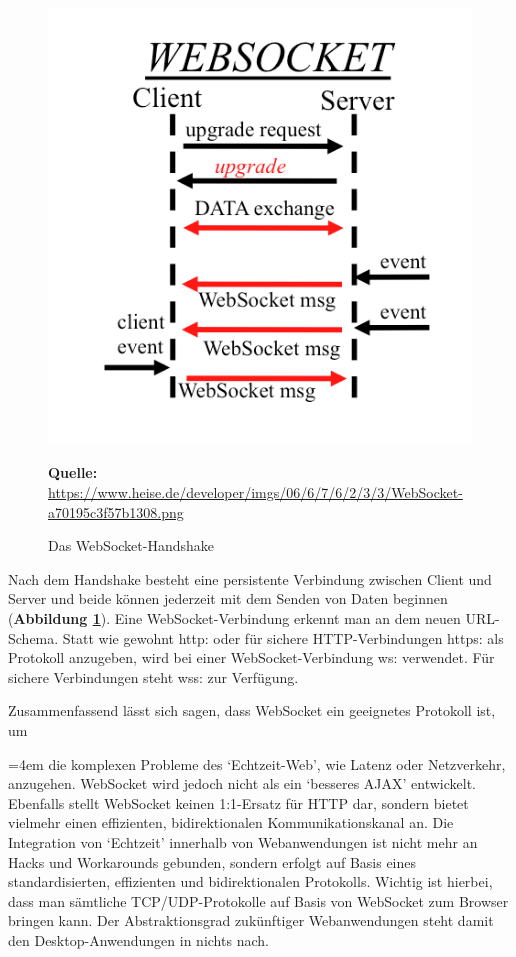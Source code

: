 \begin{figure}[H]
  \begin{center}
    \includegraphics[scale=0.4]{img/webSocketHandshake}
	\caption{Das WebSocket-Handshake}
	\footnotesize\sffamily\textbf{Quelle:} \url{https://www.heise.de/developer/imgs/06/6/7/6/2/3/3/WebSocket-a70195c3f57b1308.png} 
	\label{fig:webSocketHandshake}
  \end{center}   
\end{figure}

Nach dem Handshake besteht eine persistente Verbindung zwischen Client und Server und beide können jederzeit mit dem Senden von Daten beginnen (\textbf{Abbildung \ref{fig:webSocketHandshake}}). Eine WebSocket-Verbindung erkennt man an dem neuen URL-Schema. Statt wie gewohnt \glqq http:\grqq{} oder für sichere HTTP-Verbindungen \glqq https:\grqq{} als Protokoll anzugeben, wird bei einer WebSocket-Verbindung \glqq ws:\grqq{} verwendet. Für sichere Verbindungen steht \glqq wss:\grqq{} zur Verfügung.\bigskip

Zusammenfassend lässt sich sagen, dass WebSocket ein geeignetes Protokoll ist, um \bigskip

\par
\begingroup
\leftskip=4em %
\rightskip\leftskip
\noindent \glqq [...] die komplexen Probleme des ‘Echtzeit-Web’, wie Latenz oder Netzverkehr, anzugehen. WebSocket wird jedoch nicht als ein ‘besseres AJAX’ entwickelt. Ebenfalls stellt WebSocket keinen 1:1-Ersatz für HTTP dar, sondern bietet vielmehr einen effizienten, bidirektionalen Kommunikationskanal an. Die Integration von ‘Echtzeit’ innerhalb von Webanwendungen ist nicht mehr an Hacks und Workarounds gebunden, sondern erfolgt auf Basis eines standardisierten, effizienten und bidirektionalen Protokolls. Wichtig ist hierbei, dass man sämtliche TCP/UDP-Protokolle auf Basis von WebSocket zum Browser bringen kann. Der Abstraktionsgrad zukünftiger Webanwendungen steht damit den Desktop-Anwendungen in nichts nach.\grqq{} \cite{Matt2011}
\par
\endgroup

